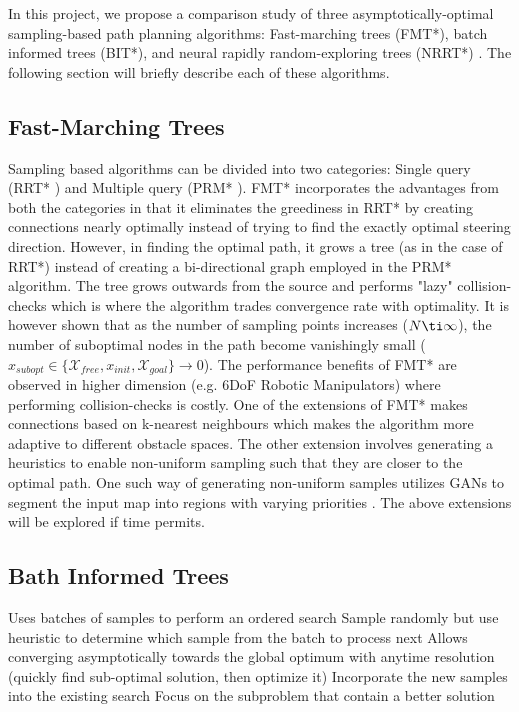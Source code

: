 \documentclass{article}
\begin{document}
In this project, we propose a comparison study of three asymptotically-optimal sampling-based path planning algorithms: Fast-marching trees (FMT*), batch informed trees (BIT*), and neural  rapidly random-exploring trees (NRRT*) \cite{nrrt}. The following section will briefly describe each of these algorithms.

\subsection{Fast-Marching Trees}
Sampling based algorithms can be divided into two categories: Single query (RRT* \cite{AOSA}) and Multiple query (PRM* \cite{AOSA}).  FMT* incorporates the advantages from both the categories in that it eliminates the greediness in RRT* by creating connections nearly optimally instead of trying to find the exactly optimal steering direction. However, in finding the optimal path, it grows a tree (as in the case of RRT*) instead of creating a bi-directional graph employed in the PRM* algorithm. The tree grows outwards from the source and performs "lazy" collision-checks which is where the algorithm trades convergence rate with optimality. It is however shown that as the number of sampling points increases ($N \ti \infty$), the number of suboptimal nodes in the path become vanishingly small ($ x_{subopt} \in \{ \mathcal{X}_{free}, x_{init}, \mathcal{X}_{goal}\} \to 0 $). The performance benefits of FMT* are observed in higher dimension (e.g. 6DoF Robotic Manipulators) where performing collision-checks is costly. One of the extensions of FMT* makes connections based on k-nearest neighbours \cite{FMT} which makes the algorithm more adaptive to different obstacle spaces. The other extension involves generating a heuristics to enable non-uniform sampling such that they are closer to the optimal path. One such way of generating non-uniform samples utilizes GANs to segment the input map into regions with varying priorities \cite{GAN}. The above extensions will be explored if time permits.

\subsection{Bath Informed Trees}
Uses batches of samples to perform an ordered search
Sample randomly but use heuristic to determine which sample from the batch to process next
Allows converging asymptotically towards the global optimum with anytime resolution (quickly find sub-optimal solution, then optimize it)
Incorporate the new samples into the existing search
Focus on the subproblem that contain a better solution
\end{document}
